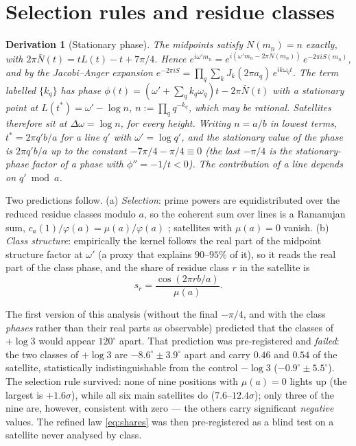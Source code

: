 \documentclass[12pt]{amsart}
\newtheorem{derivation}[observation]{Derivation}
\begin{document}
\section{Selection rules and residue classes}\label{sec:classes}

\begin{derivation}[Stationary phase]\label{der:sp}
The midpoints satisfy $N(m_n) = n$ exactly, with
$2\pi\bar N(t) = tL(t) - t + 7\pi/4$. Hence
$e^{i\omega' m_n} = e^{i(\omega' m_n - 2\pi\bar N(m_n))}\,e^{-2\pi i S(m_n)}$,
and by the Jacobi--Anger expansion
$e^{-2\pi i S} = \prod_q \sum_{k} J_k(2\pi a_q)\,e^{ik\omega_q t}$. The term
labelled $\{k_q\}$ has phase
$\phi(t) = (\omega' + \sum_q k_q\omega_q)t - 2\pi\bar N(t)$ with a
stationary point at $L(t^*) = \omega' - \log n$,
$n := \prod_q q^{-k_q}$, which may be rational. Satellites therefore sit at
$\Delta\omega = \log n$, for every height. Writing $n = a/b$ in lowest
terms, $t^* = 2\pi q'b/a$ for a line $q'$ with $\omega' = \log q'$, and the
stationary value of the phase is $2\pi q'b/a$ up to the constant
$-7\pi/4 - \pi/4 \equiv 0$ (the last $-\pi/4$ is the stationary-phase
factor of a phase with $\phi'' = -1/t < 0$). The contribution of a line
depends on $q' \bmod a$.
\end{derivation}

Two predictions follow. (a) \emph{Selection}: prime powers are
equidistributed over the reduced residue classes modulo $a$, so the
coherent sum over lines is a Ramanujan sum, $c_a(1)/\varphi(a) =
\mu(a)/\varphi(a)$ \cite{Apo76}; satellites with $\mu(a) = 0$ vanish.
(b) \emph{Class structure}: empirically the kernel follows the real part
of the midpoint structure factor at $\omega'$ (a proxy that explains
$90$--$95\%$ of it), so it reads the real part of the class phase, and the
share of residue class $r$ in the satellite is
\begin{equation}\label{eq:shares}
s_r = \frac{\cos(2\pi r b/a)}{\mu(a)} .
\end{equation}

The first version of this analysis (without the final $-\pi/4$, and with
the class \emph{phases} rather than their real parts as observable)
predicted that the classes of $+\log 3$ would appear $120^\circ$ apart.
That prediction was pre-registered and \emph{failed}: the two classes of
$+\log 3$ are $-8.6^\circ \pm 3.9^\circ$ apart and carry $0.46$ and $0.54$
of the satellite, statistically indistinguishable from the control
$-\log 3$ ($-0.9^\circ\pm5.5^\circ$). The selection
rule survived: none of nine positions with $\mu(a) = 0$ lights up (the
largest is $+1.6\sigma$), while all six main satellites do
($7.6$--$12.4\sigma$); only three of the nine are, however, consistent
with zero --- the others carry significant \emph{negative} values. The refined law \eqref{eq:shares} was then
pre-registered as a blind test on a satellite never analysed by class.
\end{document}
